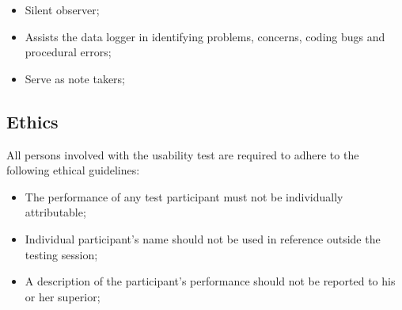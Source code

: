 \begin{itemize}
\item Silent observer;
\item Assists the data logger in identifying problems, concerns, coding bugs and procedural errors;
\item Serve as note takers;
\end{itemize}

\subsection{Ethics}

All persons involved with the usability test are required to adhere to the following ethical guidelines:

\begin{itemize}
\item The performance of any test participant must not be individually attributable;
\item Individual participant's name should not be used in reference outside the testing session;
\item A description of the participant's performance should not be reported to his or her superior;
\end{itemize}